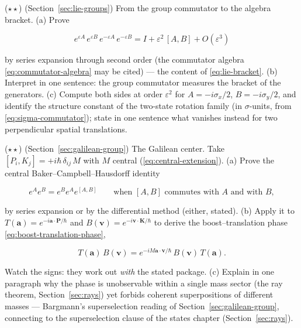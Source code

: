 \begin{problemset}
\item ($\star\star$) (Section~\ref{sec:lie-groups}) From the group commutator to the algebra bracket. (a) Prove
\begin{linenomath}
    \begin{equation}
        e^{\varepsilon A}\,e^{\varepsilon B}\,e^{-\varepsilon A}\,e^{-\varepsilon B} = I + \varepsilon^2\,[A,B] + O(\varepsilon^3)
    \end{equation}
\end{linenomath}
by series expansion through second order (the commutator algebra \eqref{eq:commutator-algebra} may be cited) --- the content of \eqref{eq:lie-bracket}. (b) Interpret in one sentence: the group commutator measures the bracket of the generators. (c) Compute both sides at order $\varepsilon^2$ for $A = -i\sigma_x/2$, $B = -i\sigma_y/2$, and identify the structure constant of the two-state rotation family (in $\sigma$-units, from \eqref{eq:sigma-commutator}); state in one sentence what vanishes instead for two perpendicular spatial translations.

\item ($\star\star$) (Section~\ref{sec:galilean-group}) The Galilean center. Take $[P_i,K_j] = +i\hbar\,\delta_{ij}\,M$ with $M$ central (\eqref{eq:central-extension}). (a) Prove the central Baker--Campbell--Hausdorff identity
\begin{linenomath}
    \begin{equation}
        e^{A}e^{B} = e^{B}e^{A}e^{[A,B]}
        \qquad\text{when } [A,B] \text{ commutes with } A \text{ and with } B ,
    \end{equation}
\end{linenomath}
by series expansion or by the differential method (either, stated). (b) Apply it to $T(\bm a) = e^{-i\bm a\cdot\bm P/\hbar}$ and $B(\bm v) = e^{-i\bm v\cdot\bm K/\hbar}$ to derive the boost--translation phase \eqref{eq:boost-translation-phase},
\begin{linenomath}
    \begin{equation}
        T(\bm a)\,B(\bm v) = e^{-iM\bm a\cdot\bm v/\hbar}\,B(\bm v)\,T(\bm a) .
    \end{equation}
\end{linenomath}
Watch the signs: they work out \emph{with} the stated package. (c) Explain in one paragraph why the phase is unobservable within a single mass sector (the ray theorem, Section~\ref{sec:rays}) yet forbids coherent superpositions of different masses --- Bargmann's superselection reading of Section~\ref{sec:galilean-group}, connecting to the superselection clause of the states chapter (Section~\ref{sec:rays}).


\end{problemset}
